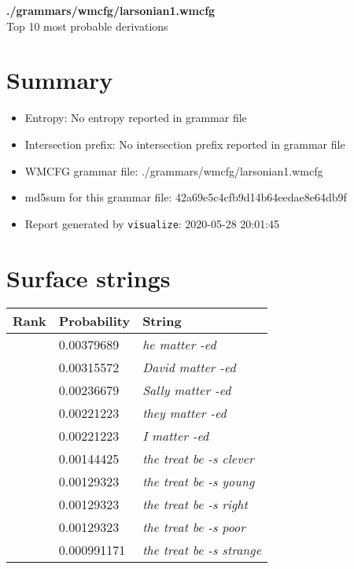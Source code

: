 \documentclass[11pt]{article}
\begin{document}
\begin{center}
{\huge \textbf{./grammars/wmcfg/larsonian1.wmcfg}} \\[0.5em]
{\normalsize Top 10 most probable derivations}
\end{center}

\section{Summary}
\begin{itemize}
	\item Entropy: No entropy reported in grammar file
	\item Intersection prefix: No intersection prefix reported in grammar file
	\item WMCFG grammar file: ./grammars/wmcfg/larsonian1.wmcfg
	\item md5sum for this grammar file: 42a69e5c4cfb9d14b64eedae8e64db9f
	\item Report generated by \texttt{visualize}: 2020-05-28 20:01:45
\end{itemize}

\section{Surface strings}
\hspace{1em}
\renewcommand{\arraystretch}{1.15}
\newcommand\rownumber{\stepcounter{rownumber}\arabic{rownumber}}
\begin{tabular}{l l l}
	\hline
	 Rank & Probability & String \\
	\hline
\rownumber & 0.00379689 & \textit{he matter -ed} \\
\rownumber & 0.00315572 & \textit{David matter -ed} \\
\rownumber & 0.00236679 & \textit{Sally matter -ed} \\
\rownumber & 0.00221223 & \textit{they matter -ed} \\
\rownumber & 0.00221223 & \textit{I matter -ed} \\
\rownumber & 0.00144425 & \textit{the treat be -s clever} \\
\rownumber & 0.00129323 & \textit{the treat be -s young} \\
\rownumber & 0.00129323 & \textit{the treat be -s right} \\
\rownumber & 0.00129323 & \textit{the treat be -s poor} \\
\rownumber & 0.000991171 & \textit{the treat be -s strange} \\
	\hline
\end{tabular}
\pagebreak
\end{document}
